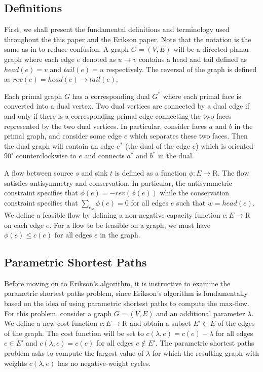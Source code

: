 \documentclass[12pt]{article}
\begin{document}
\subsection{Definitions}

First, we shall present the fundamental definitions and terminology used throughout the this paper and the Erikson \cite{erikson2010} paper. Note that the notation is the same as in \cite{erikson2010} to reduce confusion. A graph $G = (V,E)$ will be a directed planar graph where each edge $e$ denoted as $u \to v$ contains a head and tail defined as $head(e) = v$ and $tail(e) = u$ respectively. The reversal of the graph is defined as $rev(e) = head(e) \to tail(e)$. 

Each primal graph $G$ has a corresponding dual $G^*$ where each primal face is converted into a dual vertex. Two dual vertices are connected by a dual edge if and only if there is a corresponding primal edge connecting the two faces represented by the two dual vertices. In particular, consider faces $a$ and $b$ in the primal graph, and consider some edge $e$ which separates these two faces. Then the dual graph will contain an edge $e^*$ (the dual of the edge $e$) which is oriented $90^\circ$ counterclockwise to $e$ and connects $a^*$ and $b^*$ in the dual. 

A flow between source $s$ and sink $t$ is defined as a function $\phi : E \to \mathrm{R}$. The flow satisfies antisymmetry and conservation. In particular, the antisymmetric constraint specifies that $\phi(e) = -rev(\phi(e))$ while the conservation constraint specifies that $\sum_{e_w} \phi(e) = 0$ for all edges $e$ such that $w = head(e)$. We define a feasible flow by defining a non-negative capacity function $c : E \to \mathrm{R}$ on each edge $e$. For a flow to be feasible on a graph, we must have $\phi(e) \leq c(e)$ for all edges $e$ in the graph. 

\subsection{Parametric Shortest Paths}

Before moving on to Erikson's algorithm, it is instructive to examine the parametric shortest paths problem, since Erikson's algorithm is fundamentally based on the idea of using parametric shortest paths to compute the max-flow. For this problem, consider a graph $G = (V,E)$ and an additional parameter $\lambda$. We define a new cost function $c : E \to \mathrm{R}$ and obtain a subset $E' \subset E$ of the edges of the graph. The cost function will be set to $c(\lambda, e) = c(e) - \lambda$ for all edges $e \in E'$ and $c(\lambda, e) = c(e)$ for all edges $e \notin E'$. The parametric shortest paths problem asks to compute the largest value of $\lambda$ for which the resulting graph with weights $c(\lambda, e)$ has no negative-weight cycles. 
\end{document}
